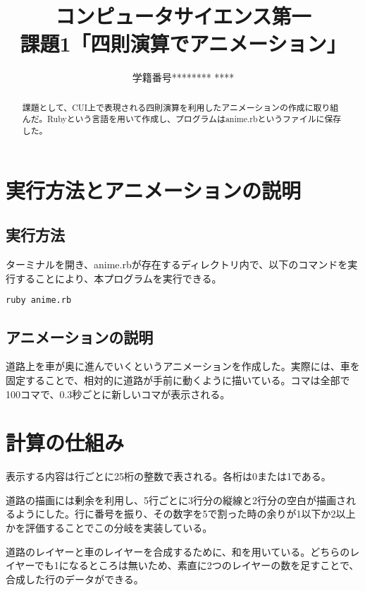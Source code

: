 \documentclass{jsarticle}
\title{コンピュータサイエンス第一\\課題1「四則演算でアニメーション」}
\author{学籍番号******** ****}
\date{}
\begin{document}
\maketitle

\begin{abstract}

課題として、CUI上で表現される四則演算を利用したアニメーションの作成に取り組んだ。Rubyという言語を用いて作成し、プログラムはanime.rbというファイルに保存した。

\end{abstract}

\section{実行方法とアニメーションの説明}

\subsection{実行方法}

ターミナルを開き、anime.rbが存在するディレクトリ内で、以下のコマンドを実行することにより、本プログラムを実行できる。

\begin{lstlisting}[language=sh]
ruby anime.rb
\end{lstlisting}

\subsection{アニメーションの説明}

道路上を車が奥に進んでいくというアニメーションを作成した。実際には、車を固定することで、相対的に道路が手前に動くように描いている。コマは全部で100コマで、0.3秒ごとに新しいコマが表示される。

\section{計算の仕組み}

表示する内容は行ごとに25桁の整数で表される。各桁は0または1である。

道路の描画には剰余を利用し、5行ごとに3行分の縦線と2行分の空白が描画されるようにした。行に番号を振り、その数字を5で割った時の余りが1以下か2以上かを評価することでこの分岐を実装している。

道路のレイヤーと車のレイヤーを合成するために、和を用いている。どちらのレイヤーでも1になるところは無いため、素直に2つのレイヤーの数を足すことで、合成した行のデータができる。
\end{document}
